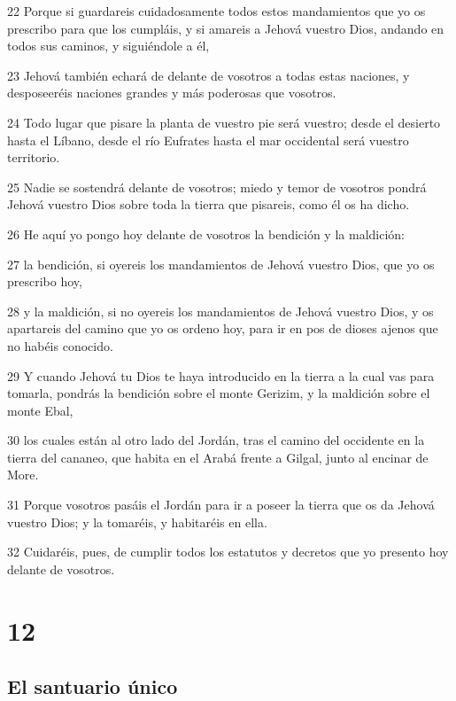 \par 22 Porque si guardareis cuidadosamente todos estos mandamientos que yo os prescribo para que los cumpláis, y si amareis a Jehová vuestro Dios, andando en todos sus caminos, y siguiéndole a él,
\par 23 Jehová también echará de delante de vosotros a todas estas naciones, y desposeeréis naciones grandes y más poderosas que vosotros.
\par 24 Todo lugar que pisare la planta de vuestro pie será vuestro; desde el desierto hasta el Líbano, desde el río Eufrates hasta el mar occidental será vuestro territorio.
\par 25 Nadie se sostendrá delante de vosotros; miedo y temor de vosotros pondrá Jehová vuestro Dios sobre toda la tierra que pisareis, como él os ha dicho.
\par 26 He aquí yo pongo hoy delante de vosotros la bendición y la maldición:
\par 27 la bendición, si oyereis los mandamientos de Jehová vuestro Dios, que yo os prescribo hoy,
\par 28 y la maldición, si no oyereis los mandamientos de Jehová vuestro Dios, y os apartareis del camino que yo os ordeno hoy, para ir en pos de dioses ajenos que no habéis conocido.
\par 29 Y cuando Jehová tu Dios te haya introducido en la tierra a la cual vas para tomarla, pondrás la bendición sobre el monte Gerizim, y la maldición sobre el monte Ebal,
\par 30 los cuales están al otro lado del Jordán, tras el camino del occidente en la tierra del cananeo, que habita en el Arabá frente a Gilgal, junto al encinar de More.
\par 31 Porque vosotros pasáis el Jordán para ir a poseer la tierra que os da Jehová vuestro Dios; y la tomaréis, y habitaréis en ella.
\par 32 Cuidaréis, pues, de cumplir todos los estatutos y decretos que yo presento hoy delante de vosotros.

\chapter{12}

\section{El santuario único}


